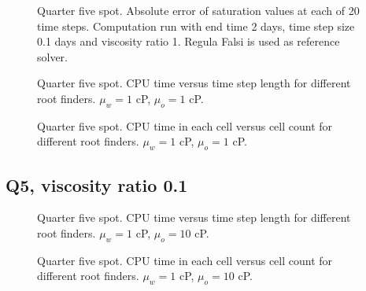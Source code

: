 \documentclass[a4paper,12pt]{report}
\begin{document}
\begin{figure}[!ht]
\begin{center}

\end{center}
\caption{Quarter five spot. Absolute error of saturation values at each of 20 time steps. Computation run with end time 2 days, time step size 0.1 days and viscosity ratio 1. Regula Falsi is used as reference solver.}
\end{figure}

\begin{figure}[!ht]
\begin{center}

\end{center}
\caption{Quarter five spot. CPU time versus time step length for different root finders. $\mu_w = 1$ cP, $\mu_o = 1$ cP. }
\end{figure}

\begin{figure}[!ht]
\begin{center}

\end{center}
\caption{Quarter five spot. CPU time in each cell versus cell count for different root finders. $\mu_w = 1$ cP, $\mu_o = 1$ cP.}
\end{figure}

\clearpage
\subsection{Q5, viscosity ratio 0.1}
\begin{figure}[!ht]
\begin{center}

\end{center}
\caption{Quarter five spot. CPU time versus time step length for different root finders. $\mu_w = 1$ cP, $\mu_o = 10$ cP.}
\end{figure}

\begin{figure}[!ht]
\begin{center}

\end{center}
\caption{Quarter five spot. CPU time in each cell versus cell count for different root finders. $\mu_w = 1$ cP, $\mu_o = 10$ cP.}
\end{figure}
\end{document}
